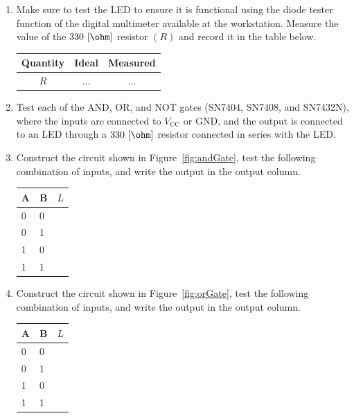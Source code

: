 \begin{enumerate}

\item Make sure to test the LED to ensure it is functional using the diode tester function of the digital multimeter available at the workstation.  Measure the value of the $330~[\ohm]$ resistor $(R)$ and record it in the table below.

  \begin{center}
    \begin{tabular}{c|c|c}
      \toprule
      Quantity &  Ideal & Measured\\
      \toprule
      $R$ & $\ldots$ & $\ldots$\\   %
      \bottomrule
    \end{tabular}    
  \end{center}

  \item Test each of the AND, OR, and NOT gates (SN7404, SN7408, and SN7432N), where the inputs are connected to $V_{\text{CC}}$ or GND, and the output is connected to an LED through a $330~[\ohm]$ resistor connected in series with the LED.
  
\item Construct the circuit shown in Figure~\ref{fig:andGate}, test the following combination of inputs, and write the output in the output column.

  \begin{center}
  \begin{tabular}{l|l|l}
    \toprule
    A&B& $L$\\
    \toprule
    0 & 0 & \\
    0 & 1 & \\
    1 & 0 & \\
    1 & 1 & \\
    \bottomrule
  \end{tabular}      
  \end{center}

  
\item Construct the circuit shown in Figure~\ref{fig:orGate}, test the following combination of inputs, and write the output in the output column.

  \begin{center}
  \begin{tabular}{l|l|l}
    \toprule
    A&B& $L$\\
    \toprule
    0 & 0 & \\
    0 & 1 & \\
    1 & 0 & \\
    1 & 1 & \\
    \bottomrule
  \end{tabular}      
\end{center}


\end{enumerate}
